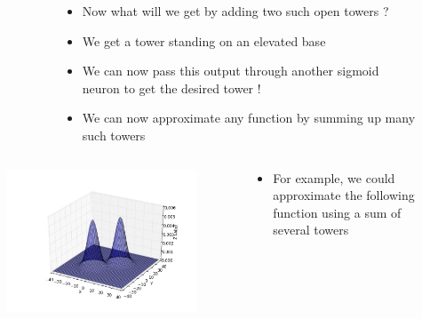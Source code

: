 \begin{frame}
\begin{columns}
\begin{overlayarea}{\textwidth}{\textheight}
{\begin{figure}
				\end{figure}
			}
		\end{overlayarea}
		\begin{overlayarea}{\textwidth}{\textheight}
			\begin{itemize}\justifying
				\item<1-> Now what will we get by adding two such open towers ?
				\item<4-> We get a tower standing on an elevated base
				\item<5-> We can now pass this output through another sigmoid neuron to get the desired tower !
				\item<7-> We can now approximate any function by summing up many such towers
			\end{itemize}
		\end{overlayarea}
	\end{columns}
\end{frame}

\begin{frame}
	\begin{columns}
		\begin{overlayarea}{\textwidth}{\textheight}
			\begin{figure}
				\includegraphics[scale=0.25]{images/module5/Plots/2bells}
			\end{figure}
		\end{overlayarea}
		\begin{overlayarea}{\textwidth}{\textheight}
			\begin{itemize}\justifying
				\item For example, we could approximate the following function using a sum of several towers
			\end{itemize}
		\end{overlayarea}
	\end{columns}
\end{frame}

